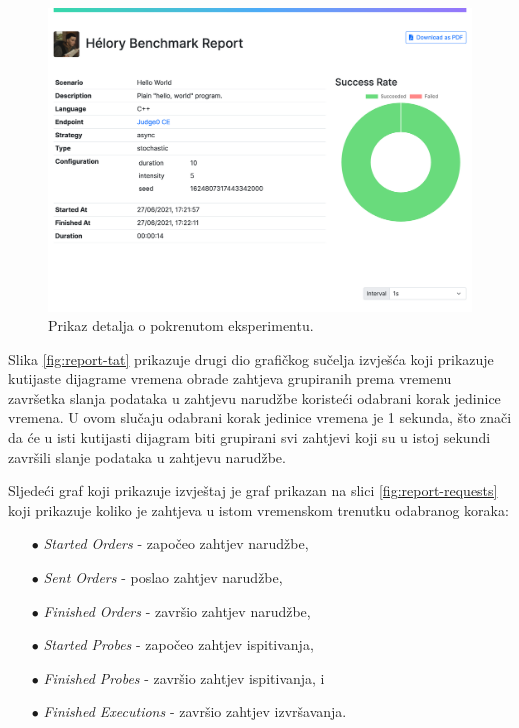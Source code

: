 \documentclass[times, utf8, diplomski]{fer}
\begin{document}
\pagebreak

\begin{figure}[htb]
	\centering
	\includegraphics[width=\textwidth]{images/Report UI 1.png}
	\caption{
		Prikaz detalja o pokrenutom eksperimentu.
	}
	\label{fig:report-experiment-details}
\end{figure}

Slika \ref{fig:report-tat} prikazuje drugi dio grafičkog sučelja izvješća koji prikazuje kutijaste dijagrame  vremena obrade zahtjeva grupiranih prema vremenu završetka slanja podataka u zahtjevu narudžbe koristeći odabrani korak jedinice vremena. U ovom slučaju odabrani korak jedinice vremena je 1 sekunda, što znači da će u isti kutijasti dijagram biti grupirani svi zahtjevi koji su u istoj sekundi završili slanje podataka u zahtjevu narudžbe. 

Sljedeći graf koji prikazuje izvještaj je graf prikazan na slici \ref{fig:report-requests} koji prikazuje koliko je zahtjeva u istom vremenskom trenutku odabranog koraka:
\begin{itemize}
    \item[$\bullet$] \textit{Started Orders} - započeo zahtjev narudžbe,
    \item[$\bullet$] \textit{Sent Orders} - poslao zahtjev narudžbe,
    \item[$\bullet$] \textit{Finished Orders} - završio zahtjev narudžbe,
    \item[$\bullet$] \textit{Started Probes} - započeo zahtjev ispitivanja,
    \item[$\bullet$] \textit{Finished Probes} - završio zahtjev ispitivanja, i
    \item[$\bullet$] \textit{Finished Executions} - završio zahtjev izvršavanja.
\end{itemize}
\end{document}
